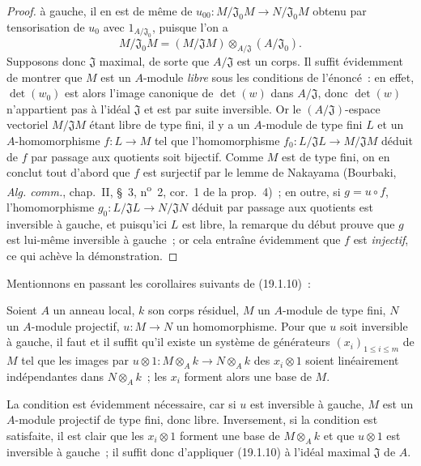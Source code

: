 \begin{proof}
à gauche, il en est de même de
$u_{00}:M/\mathfrak J_0M\to N/\mathfrak J_0M$ obtenu par tensorisation de
$u_0$ avec $1_{A/\mathfrak J_0}$, puisque l'on a
\[
  M/\mathfrak J_0M=(M/\mathfrak JM)\otimes_{A/\mathfrak J}(A/\mathfrak J_0).
\]
Supposons donc $\mathfrak J$ maximal, de sorte que $A/\mathfrak J$ est un
corps. Il suffit évidemment de montrer que $M$ est un $A$-module \emph{libre}
sous les conditions de l'énoncé~: en effet, $\det(w_0)$ est alors l'image
canonique de $\det(w)$ dans $A/\mathfrak J$, donc $\det(w)$ n'appartient pas à
l'idéal $\mathfrak J$ et est par suite inversible. Or le
$(A/\mathfrak J)$-espace vectoriel $M/\mathfrak JM$ étant libre de type fini,
il y a un $A$-module de type fini $L$ et un $A$-homomorphisme $f:L\to M$ tel
que l'homomorphisme $f_0:L/\mathfrak JL\to M/\mathfrak JM$ déduit de $f$ par
passage aux quotients soit bijectif. Comme $M$ est de type fini, on en conclut
tout d'abord que $f$ est surjectif par le lemme de Nakayama (Bourbaki,
\emph{Alg. comm.}, chap.~II, §~3, n\textsuperscript{o}~2, cor.~1 de la
prop.~4)~; en outre, si $g=u\circ f$, l'homomorphisme
$g_0:L/\mathfrak JL\to N/\mathfrak JN$ déduit par passage aux quotients est
inversible à gauche, et puisqu'ici $L$ est libre, la remarque du début prouve
que $g$ est lui-même inversible à gauche~; or cela entraîne évidemment que
$f$ est \emph{injectif}, ce qui achève la démonstration.
\end{proof}

Mentionnons en passant les corollaires suivants de (19.1.10)~:

\begin{corollary}[19.1.11]
\label{0.19.1.11-fr}
Soient $A$ un anneau local, $k$ son corps résiduel, $M$ un $A$-module de type
fini, $N$ un $A$-module projectif, $u:M\to N$ un homomorphisme. Pour que $u$
soit inversible à gauche, il faut et il suffit qu'il existe un système de
générateurs $(x_i)_{1\leq i\leq m}$ de $M$ tel que les images par
$u\otimes 1:M\otimes_Ak\to N\otimes_Ak$ des $x_i\otimes1$ soient linéairement
indépendantes dans $N\otimes_Ak$~; les $x_i$ forment alors une base de $M$.
\end{corollary}

La condition est évidemment nécessaire, car si $u$ est inversible à gauche,
$M$ est un $A$-module projectif de type fini, donc libre. Inversement, si la
condition est satisfaite, il est clair que les $x_i\otimes1$ forment une base
de $M\otimes_Ak$ et que $u\otimes1$ est inversible à gauche~; il suffit donc
d'appliquer (19.1.10) à l'idéal maximal $\mathfrak J$ de $A$.

